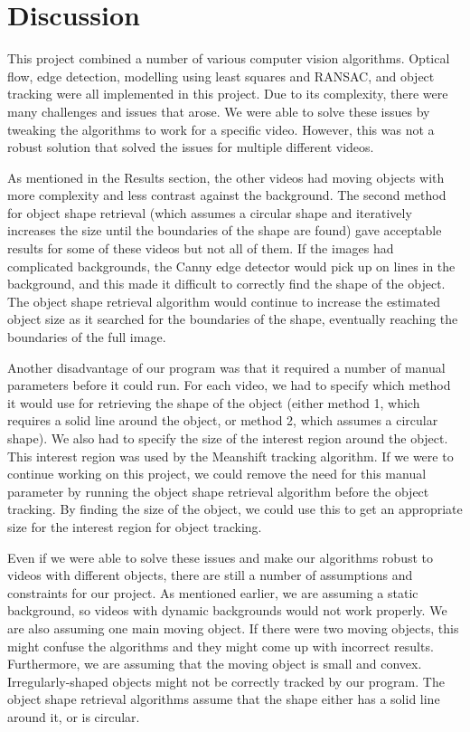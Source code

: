 \documentclass[12pt]{article}
\begin{document}
\clearpage
\section*{Discussion}

This project combined a number of various computer vision algorithms. Optical flow, edge detection, modelling using least squares and RANSAC, and object tracking were all implemented in this project. Due to its complexity, there were many challenges and issues that arose. We were able to solve these issues by tweaking the algorithms to work for a specific video. However, this was not a robust solution that solved the issues for multiple different videos.

As mentioned in the Results section, the other videos had moving objects with more complexity and less contrast against the background. The second method for object shape retrieval (which assumes a circular shape and iteratively increases the size until the boundaries of the shape are found) gave acceptable results for some of these videos but not all of them. If the images had complicated backgrounds, the Canny edge detector would pick up on lines in the background, and this made it difficult to correctly find the shape of the object. The object shape retrieval algorithm would continue to increase the estimated object size as it searched for the boundaries of the shape, eventually reaching the boundaries of the full image.

Another disadvantage of our program was that it required a number of manual parameters before it could run. For each video, we had to specify which method it would use for retrieving the shape of the object (either method 1, which requires a solid line around the object, or method 2, which assumes a circular shape). We also had to specify the size of the interest region around the object. This interest region was used by the Meanshift tracking algorithm. If we were to continue working on this project, we could remove the need for this manual parameter by running the object shape retrieval algorithm before the object tracking. By finding the size of the object, we could use this to get an appropriate size for the interest region for object tracking.

Even if we were able to solve these issues and make our algorithms robust to videos with different objects, there are still a number of assumptions and constraints for our project. As mentioned earlier, we are assuming a static background, so videos with dynamic backgrounds would not work properly. We are also assuming one main moving object. If there were two moving objects, this might confuse the algorithms and they might come up with incorrect results. Furthermore, we are assuming that the moving object is small and convex. Irregularly-shaped objects might not be correctly tracked by our program. The object shape retrieval algorithms assume that the shape either has a solid line around it, or is circular.
\end{document}
